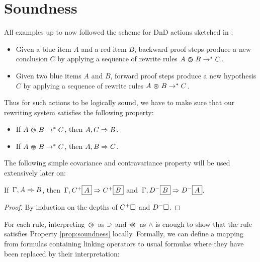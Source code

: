 \section{Soundness}


All examples up to now followed the scheme for DnD actions sketched in
:
\begin{itemize}
  \item Given a blue item $A$ and a red item $B$, backward proof steps produce a
  new conclusion $C$ by applying a sequence of rewrite rules $A \operatorname{\,\varogreaterthan\,} B \rightarrow^\ast
  C$.
  \item Given two blue items $A$ and $B$, forward proof steps produce a new
  hypothesis $C$ by applying a sequence of rewrite rules $A \operatorname{\,\varoast\,} B \rightarrow^\ast C$.
\end{itemize}

Thus for such actions to be logically sound, we have to make sure that our
rewriting system satisfies the following property:

\begin{theorem}[Soundness]\label{prop:soundness}
  \phantom{a}
  \begin{itemize}
    \item If $A \operatorname{\,\varogreaterthan\,} B \rightarrow^\ast C$, then $A, C \Rightarrow B$.
    \item If $A \operatorname{\,\varoast\,} B \rightarrow^\ast C$, then $A, B \Rightarrow C$.
  \end{itemize}
\end{theorem}

The following simple covariance and contravariance property will be used
extensively later on:
\begin{lemma}[Variance]\label{prop:cov}
  If $\, \Gamma, A\Rightarrow B$, then $\, \Gamma, C^+\fbox{$A$}\Rightarrow C^+\fbox{$B$}$
  and $\, \Gamma, D^-\fbox{$B$}\Rightarrow D^-\fbox{$A$}$.
\end{lemma}
\begin{proof}
  By induction on the depths of $C^+\square$ and $D^-\square$.
\end{proof}

For each rule, interpreting $\operatorname{\,\varogreaterthan\,}$ as $\supset$ and $\operatorname{\,\varoast\,}$ as $\land$ is enough
to show that the rule satisfies Property \ref{prop:soundness} locally. Formally,
we can define a mapping from formulas containing linking operators to usual
formulas where they have been replaced by their interpretation:

